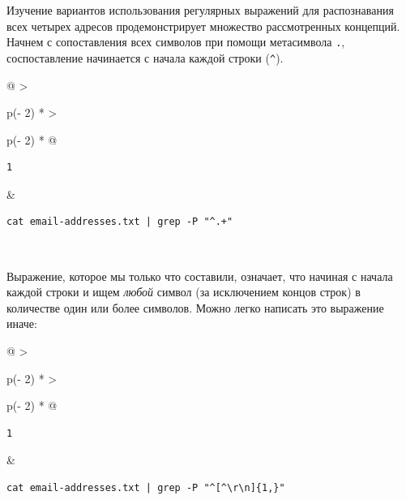 \documentclass{report}
\begin{document}
Изучение вариантов использования регулярных выражений для распознавания
всех четырех адресов продемонстрирует множество рассмотренных концепций.
Начнем с сопоставления всех символов при помощи метасимвола \texttt{.},
соспоставление начинается с начала каждой строки (\texttt{\^{}}).

\begin{longtable}[]{@{}
  >{\raggedright\arraybackslash}p{(\columnwidth - 2\tabcolsep) * }
  >{\raggedright\arraybackslash}p{(\columnwidth - 2\tabcolsep) * }@{}}
\toprule
\endhead
\begin{minipage}[t]{\linewidth}\raggedright
\begin{verbatim}
1
\end{verbatim}
\end{minipage} & \begin{minipage}[t]{\linewidth}\raggedright
\begin{verbatim}
cat email-addresses.txt | grep -P "^.+"
\end{verbatim}
\end{minipage} \\ \addlinespace
\bottomrule
\end{longtable}

Выражение, которое мы только что составили, означает, что начиная с
начала каждой строки и ищем \emph{любой} символ (за исключением концов
строк) в количестве один или более символов. Можно легко написать это
выражение иначе:

\begin{longtable}[]{@{}
  >{\raggedright\arraybackslash}p{(\columnwidth - 2\tabcolsep) * }
  >{\raggedright\arraybackslash}p{(\columnwidth - 2\tabcolsep) * }@{}}
\toprule
\endhead
\begin{minipage}[t]{\linewidth}\raggedright
\begin{verbatim}
1
\end{verbatim}
\end{minipage} & \begin{minipage}[t]{\linewidth}\raggedright
\begin{verbatim}
cat email-addresses.txt | grep -P "^[^\r\n]{1,}"
\end{verbatim}
\end{minipage} \\ \addlinespace
\bottomrule
\end{longtable}
\end{document}
